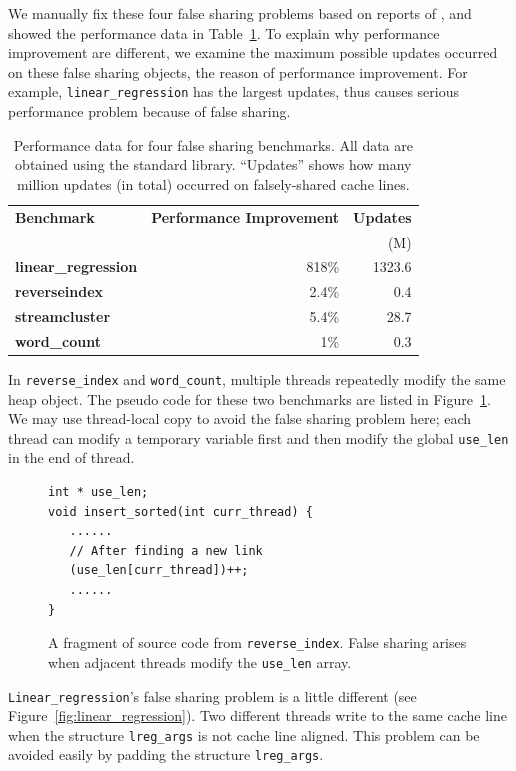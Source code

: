 We manually fix these four false sharing problems based on reports of \SheriffDetect{}, and showed the performance data in Table~\ref{table:perfafterfix}. To explain why performance improvement are different, we examine the maximum possible updates occurred on these false sharing objects, the reason of performance improvement. For example, \texttt{linear\_regression} has the largest updates, thus causes serious performance problem because of false sharing. 

\begin{table}
\centering
\begin{tabular}{l|r|r}
\hline
{\bf \small Benchmark} & {\bf \small Performance Improvement} & {\bf \small Updates}\\
 & & (M)\\
\hline
\small \textbf{linear\_regression} & 818\% & 1323.6\\
\small \textbf{reverseindex} &  2.4\% & 0.4\\
\small \textbf{streamcluster} & 5.4\% & 28.7\\
\small \textbf{word\_count} &  1\% & 0.3\\
\hline
\end{tabular}
\caption{Performance data for four false sharing benchmarks. 
All data are obtained using the standard \pthreads{} library. 
``Updates'' shows how many million updates (in total) occurred on falsely-shared cache lines.
\label{table:perfafterfix}}
\end{table}


In \texttt{reverse\_index} and \texttt{word\_count}, multiple threads repeatedly modify the same heap object. The pseudo code for these two benchmarks are listed in Figure~\ref{fig:reverseindex}. We may use thread-local copy to avoid the false sharing problem here; each thread can modify a temporary variable first and then modify the global \texttt{use\_len} in the end of thread.

\begin{figure}[!t]
\begin{lstlisting}
int * use_len;
void insert_sorted(int curr_thread) {
   ......	
   // After finding a new link
   (use_len[curr_thread])++;
   ......	
}
\end{lstlisting}
\caption{A fragment of source code from \texttt{reverse\_index}. False sharing arises when adjacent threads 
modify the \texttt{use\_len} array. 
\label{fig:reverseindex}}
\end{figure}

\texttt{Linear\_regression}'s false sharing problem is a little different (see Figure~\ref{fig:linear_regression}). 
Two different threads write to the same cache line when the
structure \texttt{lreg\_args} is not cache line aligned. This problem can be avoided easily by padding the structure \texttt{lreg\_args}.

